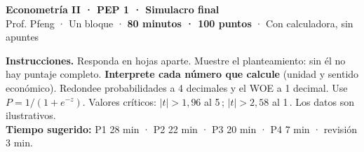 \documentclass[11pt,a4paper]{article}
\begin{document}
\renewcommand{\%}{\ifmmode\mbox{\char37}\else\char37\fi}

\begin{center}
{\Large\bfseries Econometría II · PEP 1 · Simulacro final}\\[3pt]
Prof. Pfeng · Un bloque · \textbf{80 minutos · 100 puntos} · Con calculadora, sin apuntes
\end{center}

\begin{tcolorbox}[colback=gray!5,colframe=gray!60,boxrule=0.5pt,left=5pt,right=5pt,top=2pt,bottom=2pt]
\small
\textbf{Instrucciones.} Responda en hojas aparte. Muestre el planteamiento: sin él no hay puntaje completo. \textbf{Interprete cada número que calcule} (unidad y sentido económico). Redondee probabilidades a 4 decimales y el WOE a 1 decimal. Use $P=1/(1+e^{-z})$. Valores críticos: $|t|>1{,}96$ al 5\,\%; $|t|>2{,}58$ al 1\,\%. Los datos son ilustrativos.\\[3pt]
\textbf{Tiempo sugerido:} P1 28 min · P2 22 min · P3 20 min · P4 7 min · revisión 3 min.
\end{tcolorbox}
\end{document}
